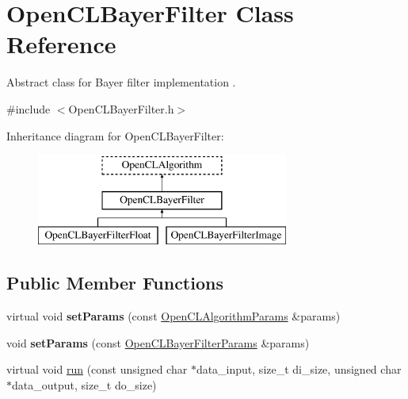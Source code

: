 \hypertarget{class_open_c_l_bayer_filter}{\section{Open\-C\-L\-Bayer\-Filter Class Reference}
\label{class_open_c_l_bayer_filter}
}


Abstract class for Bayer filter implementation .  




{\ttfamily \#include $<$Open\-C\-L\-Bayer\-Filter.\-h$>$}

Inheritance diagram for Open\-C\-L\-Bayer\-Filter\-:\begin{figure}[H]
\begin{center}
\leavevmode
\includegraphics[height=3.000000cm]{class_open_c_l_bayer_filter}
\end{center}
\end{figure}
\subsection*{Public Member Functions}
\begin{DoxyCompactItemize}
\item 
\hypertarget{class_open_c_l_bayer_filter_ada768f4695c19bf563da79b303acfa8c}{virtual void {\bfseries set\-Params} (const \hyperlink{class_open_c_l_algorithm_params}{Open\-C\-L\-Algorithm\-Params} \&params)}\label{class_open_c_l_bayer_filter_ada768f4695c19bf563da79b303acfa8c}

\item 
\hypertarget{class_open_c_l_bayer_filter_af5c135c7124f7353cd5c1274d1a607ff}{void {\bfseries set\-Params} (const \hyperlink{class_open_c_l_bayer_filter_params}{Open\-C\-L\-Bayer\-Filter\-Params} \&params)}\label{class_open_c_l_bayer_filter_af5c135c7124f7353cd5c1274d1a607ff}

\item 
virtual void \hyperlink{class_open_c_l_bayer_filter_ac0ffdd5af33fa1c8cb82d2fdf0b6180f}{run} (const unsigned char $\ast$data\-\_\-input, size\-\_\-t di\-\_\-size, unsigned char $\ast$data\-\_\-output, size\-\_\-t do\-\_\-size)
\end{DoxyCompactItemize}
